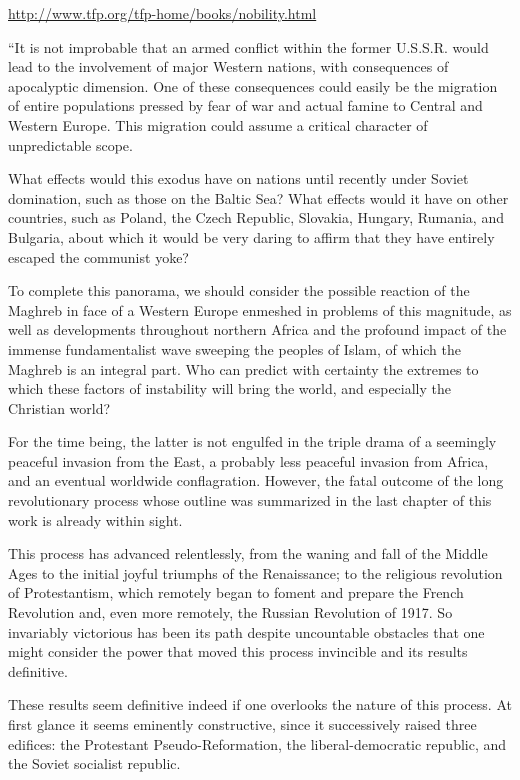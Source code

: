 \begin{footnotesize}
\begin{sffamily}
\url{http://www.tfp.org/tfp-home/books/nobility.html}


``It is not improbable that an armed conflict within the former U.S.S.R. would lead to the involvement of major Western nations, with consequences of apocalyptic dimension. One of these consequences could easily be the migration of entire populations pressed by fear of war and actual famine to Central and Western Europe. This migration could assume a critical character of unpredictable scope.

What effects would this exodus have on nations until recently under Soviet domination, such as those on the Baltic Sea? What effects would it have on other countries, such as Poland, the Czech Republic, Slovakia, Hungary, Rumania, and Bulgaria, about which it would be very daring to affirm that they have entirely escaped the communist yoke?

To complete this panorama, we should consider the possible reaction of the Maghreb in face of a Western Europe enmeshed in problems of this magnitude, as well as developments throughout northern Africa and the profound impact of the immense fundamentalist wave sweeping the peoples of Islam, of which the Maghreb is an integral part. Who can predict with certainty the extremes to which these factors of instability will bring the world, and especially the Christian world?

For the time being, the latter is not engulfed in the triple drama of a seemingly peaceful invasion from the East, a probably less peaceful invasion from Africa, and an eventual worldwide conflagration. However, the fatal outcome of the long revolutionary process whose outline was summarized in the last chapter of this work is already within sight.

This process has advanced relentlessly, from the waning and fall of the Middle Ages to the initial joyful triumphs of the Renaissance; to the religious revolution of Protestantism, which remotely began to foment and prepare the French Revolution and, even more remotely, the Russian Revolution of 1917. So invariably victorious has been its path despite uncountable obstacles that one might consider the power that moved this process invincible and its results definitive.

These results seem definitive indeed if one overlooks the nature of this process. At first glance it seems eminently constructive, since it successively raised three edifices: the Protestant Pseudo-Reformation, the liberal-democratic republic, and the Soviet socialist republic.


\end{sffamily}
\end{footnotesize}
